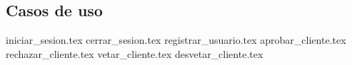 %
%
%

\subsection{Casos de uso}

{iniciar_sesion.tex}
{cerrar_sesion.tex}
{registrar_usuario.tex}
{aprobar_cliente.tex}
{rechazar_cliente.tex}
{vetar_cliente.tex}
{desvetar_cliente.tex}
